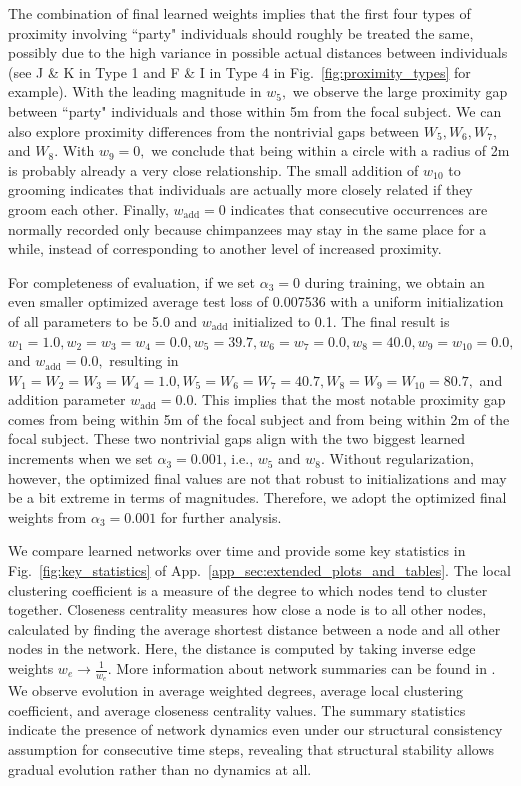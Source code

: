 \documentclass{article}
\theoremstyle{plain}
\theoremstyle{definition}
\theoremstyle{remark}
\begin{document}
The combination of final learned weights implies that the first four types of proximity involving ``party" individuals should roughly be treated the same, possibly due to the high variance in possible actual distances between individuals (see J \& K in Type 1 and F \& I in Type 4 in Fig.~\ref{fig:proximity_types} for example). With the leading magnitude in $w_5,$ we observe the large proximity gap between ``party" individuals and those within 5m from the focal subject. We can also explore proximity differences from the nontrivial gaps between $W_5, W_6, W_7,$ and $W_8.$ With $w_9=0,$ we conclude that being within a circle with a radius of 2m is probably already a very close relationship. The small addition of $w_{10}$ to grooming indicates that individuals are actually more closely related if they groom each other. Finally, $w_\text{add}=0$ indicates that consecutive occurrences are normally recorded only because chimpanzees may stay in the same place for a while, instead of corresponding to another level of increased proximity.


For completeness of evaluation, if we set $\alpha_3=0$ during training, we obtain an even smaller optimized average test loss of 0.007536 with a uniform initialization of all parameters to be 5.0 and $w_\text{add}$ initialized to 0.1. The final result is $w_1=1.0, w_2=w_3=w_4=0.0, w_5=39.7, w_6=w_7=0.0, w_8=40.0, w_9=w_{10}=0.0,$ and $w_\text{add}=0.0,$ resulting in $W_1=W_2=W_3=W_4=1.0, W_5=W_6=W_7=40.7, W_8=W_9=W_{10}=80.7,$ and addition parameter $w_\text{add}=0.0.$ This implies that the most notable proximity gap comes from being within 5m of the focal subject and from being within 2m of the focal subject. These two nontrivial gaps align with the two biggest learned increments when we set $\alpha_3=0.001$, i.e., $w_5$ and $w_8.$ Without regularization, however, the optimized final values are not that robust to initializations and may be a bit extreme in terms of magnitudes. Therefore, we adopt the optimized final weights from $\alpha_3=0.001$ for further analysis.


We compare learned networks over time and provide some key statistics in Fig.~\ref{fig:key_statistics} of App.~\ref{app_sec:extended_plots_and_tables}. 
The local clustering coefficient is a measure of the degree to which nodes tend to cluster together. Closeness centrality measures how close a node is to all other nodes, calculated by finding the average shortest distance between a node and all other nodes in the network. Here, the distance is computed by taking inverse edge weights $w_e\rightarrow\frac{1}{w_e}$. More information about network summaries can be found in \citet{newman2018networks}. We observe evolution in average weighted degrees, average local clustering coefficient, and average closeness centrality values. The summary statistics indicate the presence of network dynamics even under our structural consistency assumption for consecutive time steps, revealing that structural stability allows gradual evolution rather than no dynamics at all. 
\end{document}
